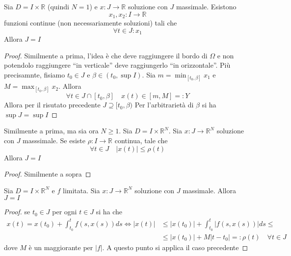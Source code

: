 \begin{proposition}
    Sia \(D = I \times \mathbb{R}\) (quindi \(N = 1\)) e \(x : J \to
    \mathbb{R}\) soluzione con \(J\) massimale.
    Esistono
    \[
        x_{1}, x_{2} : I \to \mathbb{R}
    \]
    funzioni continue (non necessariamente soluzioni) tali che 
    \[
        \forall  t \in J : x_{1}
    \]
    Allora \(J = I\) 
\end{proposition}
\begin{proof}
    Similmente a prima, l'idea è che deve raggiungere il bordo di \(\Omega\) e
    non potendolo raggiungere ``in verticale'' deve raggiungerlo ``in
    orizzontale''. Più precisamnte, fisiamo \(t_{0} \in J\) e \(\beta \in
    (t_{0}, \sup I)\). Sia \(m = \min_{[t_{0}, \beta]} x_{1} \) e \(M =
    \max_{[t_{0}, \beta]}x_{2} \). Allora 
    \[
        \forall t \in J \cap [t_{0}, \beta] \quad x(t) \in [m, M] =: Y
    \]
    Allora per il risutato precedente \(J \supseteq [t_{0}, \beta) \) 
    Per l'arbitrarietà di \(\beta\) si ha \(\sup J = \sup I\) 
\end{proof}

\begin{proposition}
    Similmente a prima, ma sia ora \(N \ge 1\). Sia \(D = I \times
    \mathbb{R}^{N}\). Sia \(x : J \to \mathbb{R}^{N}\) soluzione con \(J\)
    masssimale. Se esiste \(\rho : I \to \mathbb{R}\) continua, tale che 
    \[
        \forall t \in J \quad |x(t)| \le \rho(t)
    \]
    Allora \(J = I\) 
\end{proposition}
\begin{proof}
    Similmente a sopra
\end{proof}

\begin{proposition}
    Sia \(D = I \times \mathbb{R}^{N}\) e \(f\) limitata.
    Sia \(x : J \to \mathbb{R}^{N}\) soluzione con \(J\) massimale. Allora \(J =
    I\) 
\end{proposition}
\begin{proof}
    se \(t_{0} \in J\) per ogni \(t \in J\) si ha che
    \begin{align*}
        x(t) = x(t_{0}) + \int_{t_{0}}^{t} f(s, x(s)) ds \iff |x(t)| &\le
        |x(t_{0})| + \int_{t_{0}}^{t} |f(s, x(s))| ds \le \\
        &\le |x(t_{0})| + M|t - t_{0}| =: \rho(t) \quad \forall t \in J
    \end{align*}
    dove \(M\) è un maggiorante per \(|f|\). A questo punto si applica il caso
    precedente 
\end{proof}

